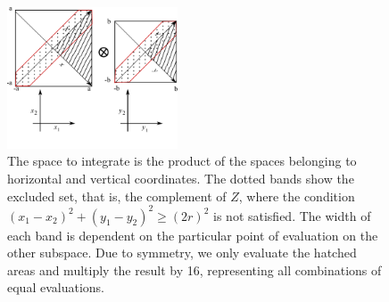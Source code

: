 \documentclass[superscriptaddress,pre,reprint,showpacs,onecolumn]{revtex4-1}
\begin{document}
\begin{figure}[h]
  \begin{center}
    \includegraphics[width=0.45\textwidth]{figures/diagramintegra01.pdf}
  \end{center}
  \caption{The space to integrate is the product of the spaces
    belonging to horizontal and vertical coordinates. The dotted
    bands show the excluded set, that is, the complement of $Z$, where the condition 
    $ (x_1-x_2)^2 + (y_1-y_2)^2 \ge (2r)^2 $ is not satisfied.
    The width of each band is dependent on the particular 
    point of evaluation
    on the other subspace. Due to 
    symmetry, we only evaluate the hatched areas and multiply
    the result by 16, representing all combinations of equal
    evaluations. 
    \label{diagintegral01}  
    }
\end{figure}
\end{document}
